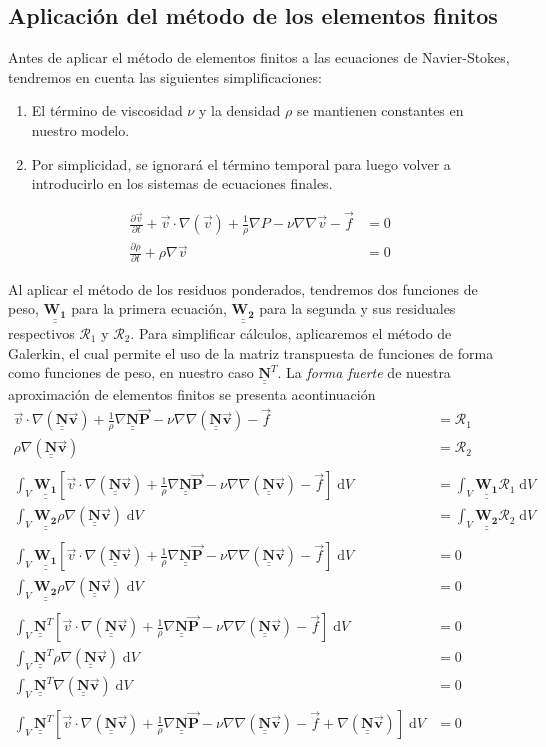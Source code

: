 \documentclass[12pt]{article}
\def\doubleunderline#1{\underline{\underline{#1}}}
\def\diffp[#1]#2{\frac{\partial#1}{\partial#2}}
\def\mt#1{\underline{\underline{\mathbf{#1}}}}
\def\d#1{\; \mathrm{d}#1}
\newcommand{\vv}{\vec{v}}
\newcommand{\vf}{\vec{f}}
\newcommand{\Pb}{\vec{\mathbf{P}}}
\newcommand{\vb}{\vec{\mathbf{v}}}
\newcommand{\nb}{\doubleunderline{\mathbf{N}}}
\begin{document}
\subsection{Aplicaci\'on del m\'etodo de los elementos finitos}
Antes de aplicar el m\'etodo de elementos finitos a las ecuaciones de Navier-Stokes, tendremos en cuenta las siguientes
simplificaciones:
\begin{enumerate}
	\item El t\'ermino de viscosidad $\nu$ y la densidad $\rho$ se mantienen constantes en nuestro modelo.
	\item Por simplicidad, se ignorar\'a el t\'ermino temporal para luego volver a introducirlo en los sistemas de ecuaciones finales.
\end{enumerate}
\begin{align*}
	\diffp[\vv]{t} + \vv \cdot \nabla (\vv) + \frac{1}{\rho} \nabla P - \nu \nabla \nabla \vv - \vf &= 0 \\
	\diffp[\rho]{t} + \rho \nabla \vv &= 0
\end{align*}

Al aplicar el m\'etodo de los residuos ponderados, tendremos dos funciones de peso, $\mt{W_1}$ para la primera ecuaci\'on,
$\mt{W_2}$ para la segunda y sus residuales respectivos $\mathcal{R}_1$ y $\mathcal{R}_2$.
Para simplificar c\'alculos, aplicaremos el m\'etodo de Galerkin, el cual permite el uso
de la matriz transpuesta de funciones de forma como funciones de peso, en nuestro caso $\nb^{T}$. La \textit{forma fuerte}
de nuestra aproximaci\'on de elementos finitos se presenta acontinuaci\'on
\begin{align*}
	\vv \cdot \nabla (\nb \vb) + \frac{1}{\rho} \nabla \nb \Pb - \nu \nabla \nabla (\nb \vb)  -\vf &= \mathcal{R}_1 \\
	\rho \nabla (\nb \vb) &= \mathcal{R}_2 \\
	\\
	\int_{V} \mt{W_1} \left[ \vv \cdot \nabla (\nb \vb) + \frac{1}{\rho} \nabla \nb \Pb - \nu \nabla \nabla (\nb \vb) - \vf \right] \d{V} &= \int_{V} \mt{W_1} \mathcal{R}_1 \d{V} \\
	\int_{V} \mt{W_2} \rho \nabla (\nb \vb) \d{V} &= \int_{V} \mt{W_2} \mathcal{R}_2 \d{V} \\
	\\
	\int_{V} \mt{W_1} \left[ \vv \cdot \nabla (\nb \vb) + \frac{1}{\rho} \nabla \nb \Pb - \nu \nabla \nabla (\nb \vb) - \vf \right] \d{V} &= 0 \\
	\int_{V} \mt{W_2} \rho \nabla (\nb \vb) \d{V} &= 0 \\
	\\
	\int_{V} \nb^{T} \left[ \vv \cdot \nabla (\nb \vb) + \frac{1}{\rho} \nabla \nb \Pb - \nu \nabla \nabla (\nb \vb) - \vf \right] \d{V} &= 0 \\
	\int_{V} \nb^{T} \rho \nabla (\nb \vb) \d{V} &= 0 \\
	\int_{V} \nb^{T} \nabla (\nb \vb) \d{V} &= 0 \\
	\\
	\int_{V} \nb^{T} \left[ \vv \cdot \nabla (\nb \vb) + \frac{1}{\rho} \nabla \nb \Pb - \nu \nabla \nabla (\nb \vb) - \vf + \nabla (\nb \vb) \right] \d{V} &= 0
\end{align*}
\end{document}
